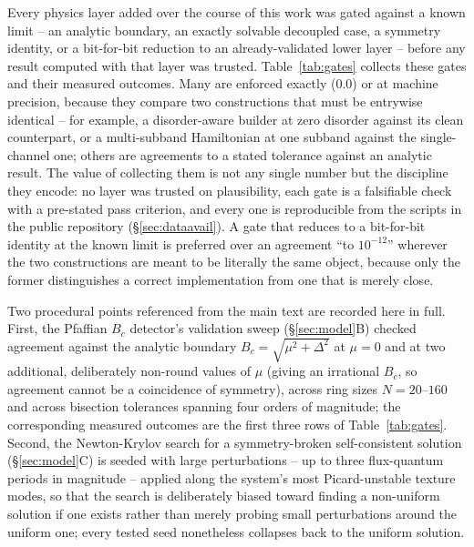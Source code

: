 \documentclass[aps,physrev,reprint,superscriptaddress,amsmath,amssymb,floatfix]{revtex4-2}
\begin{document}
Every physics layer added over the course of this work was gated against a
known limit -- an analytic boundary, an exactly solvable decoupled case, a
symmetry identity, or a bit-for-bit reduction to an already-validated lower
layer -- before any result computed with that layer was trusted.
Table~\ref{tab:gates} collects these gates and their measured outcomes.
Many are enforced exactly ($0.0$) or at machine precision, because they
compare two constructions that must be entrywise identical -- for example,
a disorder-aware builder at zero disorder against its clean counterpart, or
a multi-subband Hamiltonian at one subband against the single-channel one;
others are agreements to a stated tolerance against an analytic result. The
value of collecting them is not any single number but the discipline they
encode: no layer was trusted on plausibility, each gate is a falsifiable
check with a pre-stated pass criterion, and every one is reproducible from
the scripts in the public repository (\S\ref{sec:dataavail}). A gate that
reduces to a bit-for-bit identity at the known limit is preferred over an
agreement ``to $10^{-12}$'' wherever the two constructions are meant to be
literally the same object, because only the former distinguishes a correct
implementation from one that is merely close.

Two procedural points referenced from the main text are recorded here in
full. First, the Pfaffian $B_c$ detector's validation sweep
(\S\ref{sec:model}B) checked agreement against the analytic boundary
$B_c=\sqrt{\mu^2+\Delta^2}$ at $\mu=0$ and at two additional, deliberately
non-round values of $\mu$ (giving an irrational $B_c$, so agreement
cannot be a coincidence of symmetry), across ring sizes $N=20$--$160$ and
across bisection tolerances spanning four orders of magnitude; the
corresponding measured outcomes are the first three rows of
Table~\ref{tab:gates}. Second, the Newton-Krylov search for a
symmetry-broken self-consistent solution (\S\ref{sec:model}C) is seeded
with large perturbations -- up to three flux-quantum periods in
magnitude -- applied along the system's most Picard-unstable texture
modes, so that the search is deliberately biased toward finding a
non-uniform solution if one exists rather than merely probing small
perturbations around the uniform one; every tested seed nonetheless
collapses back to the uniform solution.
\end{document}
